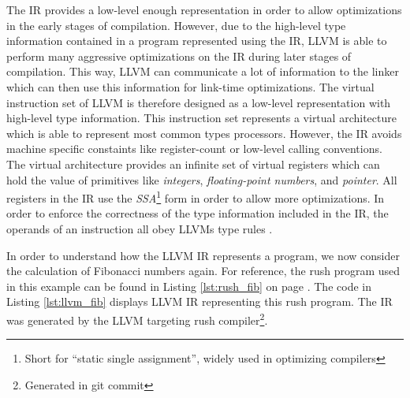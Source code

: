 The IR provides a low-level enough representation in order to allow optimizations in the early stages of compilation.
However, due to the high-level type information contained in a program represented using the IR,
LLVM is able to perform many aggressive optimizations on the IR during later stages of compilation.
This way, LLVM can communicate a lot of information to the linker which can then use this information for link-time optimizations.
The virtual instruction set of LLVM is therefore designed as a low-level representation with high-level type information.
This instruction set represents a virtual architecture which is able to represent most common types processors.
However, the IR avoids machine specific constaints like register-count or low-level calling conventions.
The virtual architecture provides an infinite set of virtual registers which can hold the value of primitives like \emph{integers}, \emph{floating-point numbers}, and \emph{pointer}.
All registers in the IR use the \emph{SSA}\footnote{Short for \enquote{static single assignment}, widely used in optimizing compilers} form in order to allow more optimizations.
In order to enforce the correctness of the type information included in the IR,
the operands of an instruction all obey LLVMs type rules \cite[p.~14-17]{Lattner:MSThesis02}.



In order to understand how the LLVM IR represents a program, we now consider the calculation of Fibonacci numbers again.
For reference, the rush program used in this example can be found in Listing \ref{lst:rush_fib} on page \pageref{lst:rush_fib}.
The code in Listing \ref{lst:llvm_fib} displays LLVM IR representing this rush program.
The IR was generated by the LLVM targeting rush compiler\footnote{Generated in git commit \rushCommit}.

